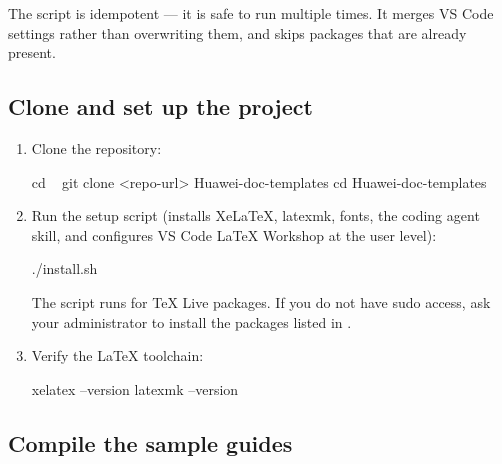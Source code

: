 \documentclass{guide}
\begin{document}
\begin{infobox}
The  script is idempotent --- it is safe to run multiple
times. It merges VS Code settings rather than overwriting them, and
 skips packages that are already present.
\end{infobox}

\subsection{Clone and set up the project}

\stepbystep
\begin{enumerate}
  \item Clone the repository:

  \begin{code}[bash]
cd ~
git clone <repo-url> Huawei-doc-templates
cd Huawei-doc-templates
  \end{code}

  \item Run the setup script (installs XeLaTeX, latexmk, fonts, the coding
        agent skill, and configures VS Code LaTeX Workshop at the user
        level):

  \begin{code}[bash]
./install.sh
  \end{code}

  \begin{warning}
  The script runs  for TeX Live packages. If you
  do not have sudo access, ask your administrator to install the packages
  listed in .
  \end{warning}

  \item Verify the LaTeX toolchain:

  \begin{code}[bash]
xelatex --version
latexmk --version
  \end{code}
\end{enumerate}

\subsection{Compile the sample guides}
\end{document}
